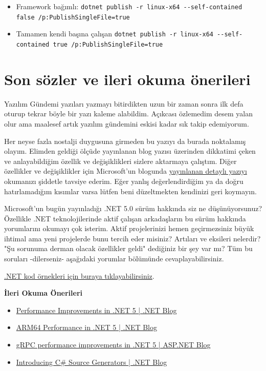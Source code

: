 \documentclass[11pt]{article}
\begin{document}
\begin{itemize}
\item Framework bağımlı: \texttt{dotnet publish -r linux-x64 -{}-self-contained false
     /p:PublishSingleFile=true}
\item Tamamen kendi başına çalışan \texttt{dotnet publish -r linux-x64 -{}-self-contained
     true /p:PublishSingleFile=true}
\end{itemize}
\section{Son sözler ve ileri okuma önerileri}
\label{sec:org4aa2b9b}
Yazılım Gündemi yazıları yazmayı bitirdikten uzun bir zaman sonra ilk defa
oturup tekrar böyle bir yazı kaleme alabildim. Açıkcası özlemedim desem yalan
olur ama maalesef artık yazılım gündemini eskisi kadar sık takip edemiyorum.

Her neyse fazla nostalji duygusuna girmeden bu yazıyı da burada noktalamış
olayım. Elimden geldiği ölçüde yayınlanan blog yazısı üzerinden dikkatimi
çeken ve anlayabildiğim özellik ve değişiklikleri sizlere aktarmaya çalıştım.
Diğer özellikler ve değişiklikler için Microsoft'un blogunda \href{https://devblogs.microsoft.com/dotnet/announcing-net-5-0/}{yayınlanan
detaylı yazıyı} okumanızı şiddetle tavsiye ederim. Eğer yanlış değerlendirdiğim
ya da doğru hatırlamadığım kısımlar varsa lütfen beni düzeltmekten kendinizi
geri koymayın.

Microsoft'un bugün yayınladığı .NET 5.0 sürüm hakkında siz ne düşünüyorsunuz?
Özellikle .NET teknolojilerinde aktif çalışan arkadaşların bu sürüm hakkında
yorumlarını okumayı çok isterim. Aktif projelerinizi hemen geçirmezsiniz büyük
ihtimal ama yeni projelerde bunu tercih eder misiniz? Artıları ve eksileri
nelerdir? "Şu sorunuma derman olacak özellikler geldi" dediğiniz bir şey var
mı? Tüm bu soruları -dilerseniz- aşağıdaki yorumlar bölümünde
cevaplayabilirsiniz.

\href{https://gist.github.com/richlander/50c34a8714eb3436e5d9d4d5d420776e}{.NET kod örnekleri için buraya tıklayabilirsiniz}.

\textbf{\textbf{İleri Okuma Önerileri}}
\begin{itemize}
\item \href{https://devblogs.microsoft.com/dotnet/performance-improvements-in-net-5/}{Performance Improvements in .NET 5 | .NET Blog}
\item \href{https://devblogs.microsoft.com/dotnet/Arm64-performance-in-net-5/}{ARM64 Performance in .NET 5 | .NET Blog}
\item \href{https://devblogs.microsoft.com/aspnet/grpc-performance-improvements-in-net-5/}{gRPC performance improvements in .NET 5 | ASP.NET Blog}
\item \href{https://devblogs.microsoft.com/dotnet/introducing-c-source-generators/}{Introducing C\# Source Generators | .NET Blog}
\end{itemize}
\end{document}
